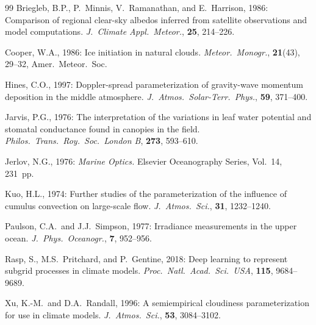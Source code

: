 \documentclass[11pt,twoside]{report}
\begin{document}
\begin{thebibliography}{99}
Briegleb, B.P., P.~Minnis, V.~Ramanathan, and E.~Harrison, 1986:
Comparison of regional clear-sky albedos inferred from satellite observations
and model computations.
\textit{J.\ Climate Appl.\ Meteor.}, \textbf{25}, 214--226.

Cooper, W.A., 1986:
Ice initiation in natural clouds.
\textit{Meteor.\ Monogr.}, \textbf{21}(43), 29--32, Amer.\ Meteor.\ Soc.

Hines, C.O., 1997:
Doppler-spread parameterization of gravity-wave momentum deposition in the
middle atmosphere.
\textit{J.\ Atmos.\ Solar-Terr.\ Phys.}, \textbf{59}, 371--400.

Jarvis, P.G., 1976:
The interpretation of the variations in leaf water potential and stomatal
conductance found in canopies in the field.
\textit{Philos.\ Trans.\ Roy.\ Soc.\ London B}, \textbf{273}, 593--610.

Jerlov, N.G., 1976:
\textit{Marine Optics.}
Elsevier Oceanography Series, Vol.~14, 231~pp.

Kuo, H.L., 1974:
Further studies of the parameterization of the influence of cumulus
convection on large-scale flow.
\textit{J.\ Atmos.\ Sci.}, \textbf{31}, 1232--1240.

Paulson, C.A.\ and J.J.~Simpson, 1977:
Irradiance measurements in the upper ocean.
\textit{J.\ Phys.\ Oceanogr.}, \textbf{7}, 952--956.

Rasp, S., M.S.~Pritchard, and P.~Gentine, 2018:
Deep learning to represent subgrid processes in climate models.
\textit{Proc.\ Natl.\ Acad.\ Sci.\ USA}, \textbf{115}, 9684--9689.

Xu, K.-M.\ and D.A.~Randall, 1996:
A semiempirical cloudiness parameterization for use in climate models.
\textit{J.\ Atmos.\ Sci.}, \textbf{53}, 3084--3102.

\end{thebibliography}
\end{document}
